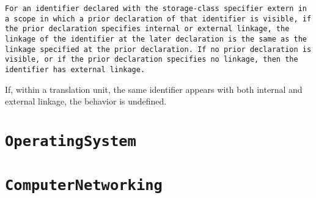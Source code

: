 \documentclass[10pt,twoside]{ctexart}
\begin{document}
{\tt For an identifier declared with the storage-class specifier extern in a scope 
in which a prior declaration of that identifier is visible, if the prior 
declaration specifies internal or external linkage, the linkage of the 
identifier at the later declaration is the same as the linkage specified 
at the prior declaration. If no prior declaration is visible, or if the 
prior declaration specifies no linkage, then the identifier has external 
linkage.

If, within a translation unit, the same identifier appears with both internal 
and external linkage, the behavior is undefined.}
\newpage
\section{\tt Operating\space System}
\subsection[\tt Linux]{\color{blue}{\tt Linux}}
\subsubsection[{\tt Linux}常见命令]{}


\newpage
\section{\tt Computer\space Networking}
\end{document}
